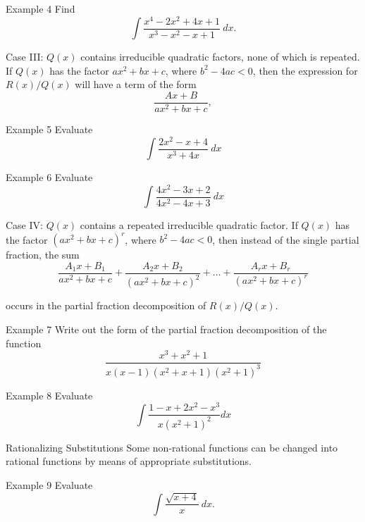 \documentclass{beamer}
\begin{document}
\begin{frame}{Example 4}
Find \[\int \dfrac{x^4 -2x^2 +4x +1}{x^3 -x^2 -x+1}~dx.\]
\end{frame}

\begin{frame}{Case III: \(Q(x)\) contains irreducible quadratic factors, none of which is repeated. }
If \(Q(x)\) has the factor \(ax^2 +bx +c\), where \(b^2 -4ac <0\), then the expression for \(R(x)/Q(x)\) will have a term of the form \[\dfrac{Ax+B}{ax^2 +bx +c},\] 
\end{frame}

\begin{frame}{Example 5}
Evaluate \[\int \dfrac{2x^2 -x +4}{x^3+4x}~dx\]
\end{frame}

\begin{frame}{Example 6}
Evaluate \[\int \dfrac{4x^2 -3x +2}{4x^2-4x+3}~dx\]
\end{frame}

\begin{frame}{Case IV: \(Q(x)\) contains a repeated irreducible quadratic factor.}
If \(Q(x)\) has the factor \((ax^2+bx+c)^r\), where \(b^2 -4ac<0\), then instead of the single partial fraction, the sum \[\dfrac{A_1x +B_1}{ax^2+bx+c}+\dfrac{A_2x +B_2}{(ax^2+bx+c)^2}+\dots+\dfrac{A_rx +B_r}{(ax^2+bx+c)^r}\]

occurs in the partial fraction decomposition of \(R(x)/Q(x)\).
\end{frame}

\begin{frame}{Example 7}
Write out the form of the partial fraction decomposition of the function \[
\dfrac{x^3 +x^2 +1}{x(x-1)(x^2+x+1)(x^2+1)^3}
\]
\end{frame}

\begin{frame}{Example 8}
Evaluate \[
\int \dfrac{1-x+2x^2-x^3}{x(x^2+1)^2}dx
\]
\end{frame}

\begin{frame}{Rationalizing Substitutions}
Some non-rational functions can be changed into rational functions by means of appropriate substitutions. 
\begin{block}{Example 9}
Evaluate \[\int \dfrac{\sqrt{x+4}}{x}~dx.\]
\end{block}
\end{frame}
\end{document}
